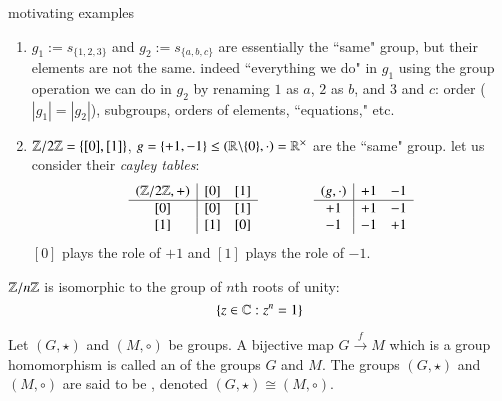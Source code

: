\documentclass[12pt, a4paper, twoside, openright, titlepage]{book}
\begin{document}
\begin{eg}{motivating examples}{}
    \leavevmode
    \begin{enumerate}
        \item $g_1 := s_{\{1,2,3\}}$ and $g_2 := s_{\{a,b,c\}}$ are essentially the ``same" group, but their elements are not the same. indeed ``everything we do" in $g_1$ using the group operation we can do in $g_2$ by renaming $1$ as $a$, $2$ as $b$, and $3$ and $c$: order ($|g_1| = |g_2|$), subgroups, orders of elements, ``equations," etc.
        \item $\mathbb Z/2\mathbb Z = \{[0],[1]\}$, $g = \{+1,-1\} \leq (\mathbb R\backslash\{0\},\cdot) = \mathbb R^{\times}$ are the ``same" group. let us consider their \emph{cayley tables}:
        \begin{equation*}
            \begin{array}{c|cc}
                (\mathbb Z/2\mathbb Z,+) & [0] & {[1]}  \\ \hline
                {[0]} & [0] & {[1]} \\
                {[1]} & [1] & {[0]} \\
            \end{array}
            \hspace{40pt}
            \begin{array}{c|cc}
                (g, \cdot) & +1 & -1  \\ \hline
                +1 & +1 & -1 \\
                -1 & -1 & +1\\
            \end{array}
        \end{equation*}
        $[0]$ plays the role of $+1$ and $[1]$ plays the role of $-1$.
    \end{enumerate} 
\end{eg}



\begin{prop}{}{}
    $\mathbb Z/n\mathbb Z$ is isomorphic to the group of $n$th roots of unity: \begin{equation}
        \{z\in\mathbb C:z^n = 1\}
    \end{equation}
\end{prop}

\begin{defn}{}{}
    Let $(G,\star)$ and $(M,\circ)$ be groups. A bijective map $G\xrightarrow{f} M$ which is a group homomorphism is called an  of the groups $G$ and $M$. The groups $(G,\star)$ and $(M,\circ)$ are said to be , denoted $(G,\star) \cong (M,\circ)$.
\end{defn}
\end{document}

